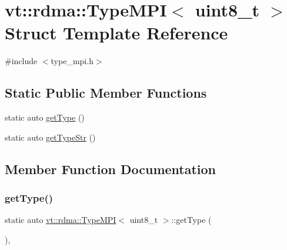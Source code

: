\hypertarget{structvt_1_1rdma_1_1_type_m_p_i_3_01uint8__t_01_4}{}\section{vt\+:\+:rdma\+:\+:Type\+M\+PI$<$ uint8\+\_\+t $>$ Struct Template Reference}
\label{structvt_1_1rdma_1_1_type_m_p_i_3_01uint8__t_01_4}


{\ttfamily \#include $<$type\+\_\+mpi.\+h$>$}

\subsection*{Static Public Member Functions}
\begin{DoxyCompactItemize}
\item 
static auto \hyperlink{structvt_1_1rdma_1_1_type_m_p_i_3_01uint8__t_01_4_a3226671df09015ea3bd48c516a0cb11c}{get\+Type} ()
\item 
static auto \hyperlink{structvt_1_1rdma_1_1_type_m_p_i_3_01uint8__t_01_4_a64e73c797cd39594ed7c0882a49aa5b1}{get\+Type\+Str} ()
\end{DoxyCompactItemize}


\subsection{Member Function Documentation}
\mbox{\label{structvt_1_1rdma_1_1_type_m_p_i_3_01uint8__t_01_4_a3226671df09015ea3bd48c516a0cb11c}} 
\subsubsection{\texorpdfstring{get\+Type()}{getType()}}
{\footnotesize\ttfamily static auto \hyperlink{structvt_1_1rdma_1_1_type_m_p_i}{vt\+::rdma\+::\+Type\+M\+PI}$<$ uint8\+\_\+t $>$\+::get\+Type (\begin{DoxyParamCaption}{ }\end{DoxyParamCaption})\hspace{0.3cm}{\ttfamily [inline]}, {\ttfamily [static]}}

